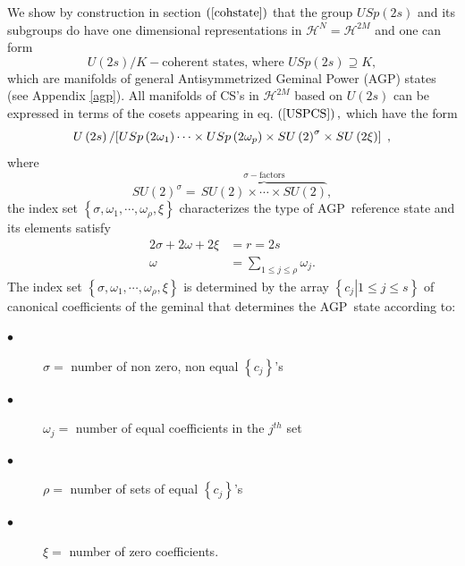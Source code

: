 \documentclass[12pt,aps,amsfonts,amssymb,tightenlines]{revtex4}%
\begin{document}
We show by construction in section $\left(  \ref{cohstate}\right)  $ that the
group $USp\left(  2s\right)  $ and its subgroups do have one dimensional
representations in $\mathcal{H}^{N}=\mathcal{H}^{2M}$ and one can form
\begin{equation}
U\left(  2s\right)  /K-\text{coherent states, where }USp\left(  2s\right)
\supseteq K, \label{USPCS}%
\end{equation}
which are manifolds of general Antisymmetrized Geminal Power (AGP) states (see
Appendix \ref{agp}). All manifolds of CS's in $\mathcal{H}^{2M}$ based on
$U\left(  2s\right)  $ can be expressed in terms of the cosets appearing in
eq. $\left(  \ref{USPCS}\right)  ,$ which have the form
\begin{equation}
U\left(  2s\right)  \left/  \left[  USp\left(  2\omega_{1}\right)
\cdots\times USp\left(  2\omega_{p}\right)  \times SU\left(  2\right)
^{\sigma}\times SU\left(  2\xi\right)  \right]  \overset{}{}\right.  ,
\end{equation}
where
\begin{equation}
SU\left(  2\right)  ^{\sigma}=\,\overset{\sigma-\text{factors}}{\overbrace
{SU\left(  2\right)  \times\cdots\times SU\left(  2\right)  }},
\end{equation}
the index set $\left\{  \sigma,\omega_{1},\cdots,\omega_{\rho},\xi\right\}  $
characterizes the type of AGP\ reference state and its elements satisfy
\begin{align}
2\sigma+2\omega+2\xi &  =r=2s\nonumber\\
\omega &  =\sum_{1\leq j\leq\rho}\omega_{j}.
\end{align}
The index set $\left\{  \sigma,\omega_{1},\cdots,\omega_{\rho},\xi\right\}  $
is determined by the array $\left\{  \left.  c_{j}\right\vert 1\leq j\leq
s\right\}  $ of canonical coefficients \cite{Weiner&ortiz04} of the geminal
that determines the AGP\ state according to:

\begin{description}
\item[$\bullet$] $\sigma=$ number of non zero, non equal $\left\{
c_{j}\right\}  $'s

\item[$\bullet$] $\omega_{j}=$ number of equal coefficients in the $j^{th}$ set

\item[$\bullet$] $\rho=$ number of sets of equal $\left\{  c_{j}\right\}  $'s

\item[$\bullet$] $\xi=$ number of zero coefficients.
\end{description}
\end{document}
